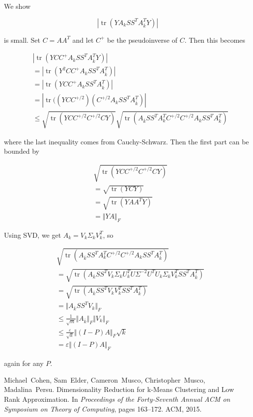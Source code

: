 \documentclass[11pt]{article}
\newcommand{\eps}{\varepsilon}
\newcommand{\Ab}{A_{\overline{k}}}
\DeclareMathOperator{\tr}{tr}
\begin{document}
We show

\[
| \tr(Y A_k SS^T \Ab^T Y) |
\]

is small. Set $C = AA^T$ and let $C^+$ be the pseudoinverse of $C$. Then this becomes

\begin{align*}
&| \tr(Y CC^+ A_k SS^T \Ab^T Y)| \\
&= |\tr(Y^2 CC^+ A_k SS^T \Ab^T)| \\
&= |\tr(Y CC^+ A_k SS^T \Ab^T)| \\
&= |\tr((Y CC^{+/2})(C^{+/2} A_k SS^T \Ab^T)| \\
&\leq \sqrt{\tr(YCC^{+/2} C^{+/2}C Y)} \sqrt{\tr(\Ab SS^T A_k^T C^{+/2}C^{+/2} A_k SS^T \Ab^T)}
\end{align*}

where the last inequality comes from Cauchy-Schwarz. Then the first part can be bounded by

\begin{align*}
&\sqrt{\tr(YCC^{+/2} C^{+/2}C Y)} \\
&= \sqrt{\tr(YCY)} \\
&= \sqrt{\tr(YAA^T Y)} \\
&= \Vert YA \Vert_F
\end{align*}

Using SVD, we get $A_k = V_k \Sigma_k V_k^T$, so

\begin{align*}
&\sqrt{\tr(\Ab SS^T A_k^T C^{+/2}C^{+/2} A_k SS^T \Ab^T)} \\
&= \sqrt{\tr(\Ab SS^T V_k \Sigma_k U_k^T U \Sigma^{-2} U^T U_k \Sigma_k V_k^T SS^T \Ab^T)} \\
&= \sqrt{\tr(\Ab SS^T V_k V_k^T SS^T \Ab^T)} \\
&= \Vert \Ab SS^T V_k \Vert_F \\
&\leq \frac{1}{\sqrt{m}} \Vert \Ab \Vert_F \Vert V_k \Vert_F \\
&\leq \frac{\eps}{\sqrt{k}} \Vert (I - P) A \Vert_F \sqrt{k} \\
&= \eps \Vert (I - P) A \Vert_F
\end{align*}

again for any $P$.



\begin{thebibliography}{42}

Michael~Cohen, Sam~Elder, Cameron~Musco, Christopher~Musco, Madalina~Persu.
\newblock Dimensionality Reduction for k-Means Clustering and Low Rank Approximation.
\newblock In {\em Proceedings of the Forty-Seventh Annual {ACM} on Symposium on Theory of Computing}, pages 163--172. ACM, 2015.

\end{thebibliography}
\end{document}
